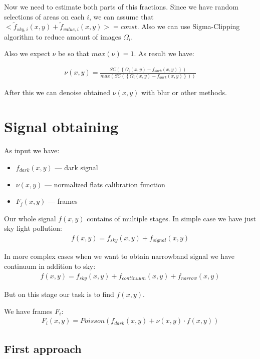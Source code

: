 \documentclass{article}
\begin{document}
Now we need to estimate both parts of this fractions. Since we have random selections of areas on each $i$, we can assume that
$<\tilde f_{sky, i}(x,y) + \tilde f_{value,i}(x,y)> = const$. Also we can use Sigma-Clipping algorithm to reduce amount of images $\Omega_i$.

Also we expect $\nu$ be so that $max(\nu) = 1$. As result we have:

\begin{eqnarray}
    \nu(x,y) = \frac{SC(\left\{ \Omega_i(x,y) - f_{dark}(x,y) \right\})}{max\left(SC(\left\{ \Omega_i(x,y) - f_{dark}(x,y) \right\})\right)}
\end{eqnarray}

After this we can denoise obtained $\nu(x,y)$ with blur or other methods.

\section{Signal obtaining}

As input we have:
\begin{itemize}
    \item $f_{dark}(x,y)$ --- dark signal
    \item $\nu(x,y)$ --- normalized flats calibration function
    \item $F_j(x,y)$ --- frames
\end{itemize}

Our whole signal $f(x,y)$ contains of multiple stages. In simple case we have just sky light pollution:
\begin{eqnarray}
    f(x,y) = f_{sky}(x,y) + f_{signal}(x,y)
\end{eqnarray}

In more complex cases when we want to obtain narrowband signal we have continuum in addition to sky:
\begin{eqnarray}
    f(x,y) = f_{sky}(x,y) + f_{continuum}(x,y) + f_{narrow}(x,y)
\end{eqnarray}

But on this stage our task is to find $f(x,y)$.

We have frames $F_i$:
\begin{eqnarray}
    F_i(x,y) = Poisson\left( f_{dark}(x,y) + \nu(x,y) \cdot f(x,y) \right)
\end{eqnarray}

\subsection{First approach}
\end{document}
